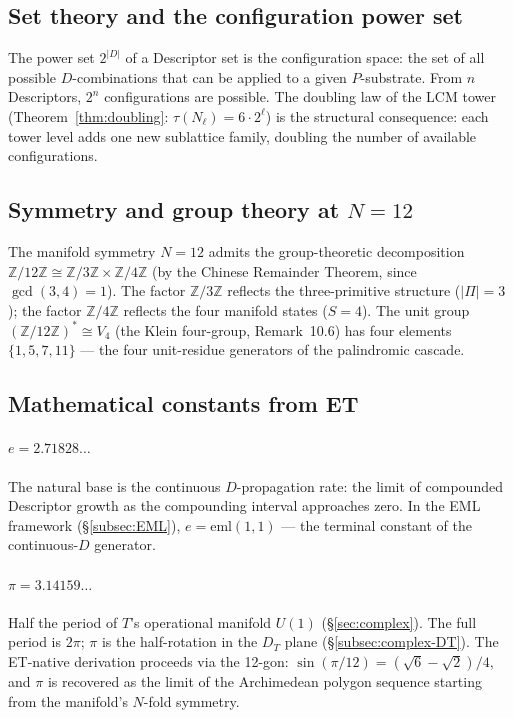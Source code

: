 \documentclass[11pt,a4paper]{article}
\theoremstyle{definition}
\theoremstyle{remark}
\begin{document}
\subsection{Set theory and the configuration power set}\label{subsec:sets-powerset}

The power set $2^{|D|}$ of a Descriptor set is the configuration space: the set of all possible $D$-combinations that can be applied to a given $P$-substrate. From $n$ Descriptors, $2^{n}$ configurations are possible. The doubling law of the LCM tower (Theorem~\ref{thm:doubling}: $\tau(N_{\ell}) = 6 \cdot 2^{\ell}$) is the structural consequence: each tower level adds one new sublattice family, doubling the number of available configurations.

\subsection{Symmetry and group theory at $N = 12$}\label{subsec:groups-N12}

The manifold symmetry $N = 12$ admits the group-theoretic decomposition $\mathbb{Z}/12\mathbb{Z} \cong \mathbb{Z}/3\mathbb{Z} \times \mathbb{Z}/4\mathbb{Z}$ (by the Chinese Remainder Theorem, since $\gcd(3,4) = 1$). The factor $\mathbb{Z}/3\mathbb{Z}$ reflects the three-primitive structure ($|\Pi| = 3$); the factor $\mathbb{Z}/4\mathbb{Z}$ reflects the four manifold states ($S = 4$). The unit group $(\mathbb{Z}/12\mathbb{Z})^{*} \cong V_{4}$ (the Klein four-group, Remark~10.6) has four elements $\{1, 5, 7, 11\}$ --- the four unit-residue generators of the palindromic cascade.

\subsection{Mathematical constants from ET}\label{subsec:constants-ET}

\paragraph{$e = 2.71828\ldots$} The natural base is the continuous $D$-propagation rate: the limit of compounded Descriptor growth as the compounding interval approaches zero. In the EML framework (\S\ref{subsec:EML}), $e = \mathrm{eml}(1,1)$ --- the terminal constant of the continuous-$D$ generator.

\paragraph{$\pi = 3.14159\ldots$} Half the period of $T$'s operational manifold $U(1)$ (\S\ref{sec:complex}). The full period is $2\pi$; $\pi$ is the half-rotation in the $D_{T}$ plane (\S\ref{subsec:complex-DT}). The ET-native derivation proceeds via the 12-gon: $\sin(\pi/12) = (\sqrt{6} - \sqrt{2})/4$, and $\pi$ is recovered as the limit of the Archimedean polygon sequence starting from the manifold's $N$-fold symmetry.
\end{document}

